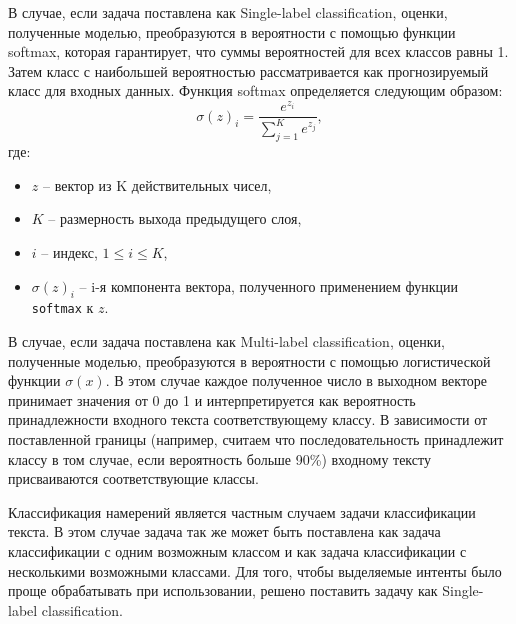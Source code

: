 В случае, если задача поставлена как Single-label classification, оценки, полученные моделью, преобразуются в вероятности с помощью функции softmax, которая гарантирует, что суммы вероятностей для всех классов равны 1. Затем класс с наибольшей вероятностью рассматривается как прогнозируемый класс для входных данных. Функция softmax определяется следующим образом:
\begin{equation}
    \sigma(z)_i = \frac{e^{z_i}}{\sum_{j=1}^{K} e^{z_j}},
\end{equation}
где:
\begin{itemize}
    \item $z$ -- вектор из K действительных чисел,
    \item $K$ -- размерность выхода предыдущего слоя,
    \item $i$ -- индекс, $1 \leq i \leq K$,
    \item $\sigma(z)_i$ -- i-я компонента вектора, полученного применением функции \texttt{softmax} к $z$.
\end{itemize}

В случае, если задача поставлена как Multi-label classification, оценки, полученные моделью, преобразуются в вероятности с помощью логистической функции $\sigma(x)$. В этом случае каждое полученное число в выходном векторе принимает значения от 0 до 1 и интерпретируется как вероятность принадлежности входного текста соответствующему классу. В зависимости от поставленной границы (например, считаем что последовательность принадлежит классу в том случае, если вероятность больше 90\%) входному тексту присваиваются соответствующие классы. 

Классификация намерений является частным случаем задачи классификации текста. В этом случае задача так же может быть поставлена как задача классификации с одним возможным классом и как задача классификации с несколькими возможными классами. Для того, чтобы выделяемые интенты было проще обрабатывать при использовании, решено поставить задачу как Single-label classification.
